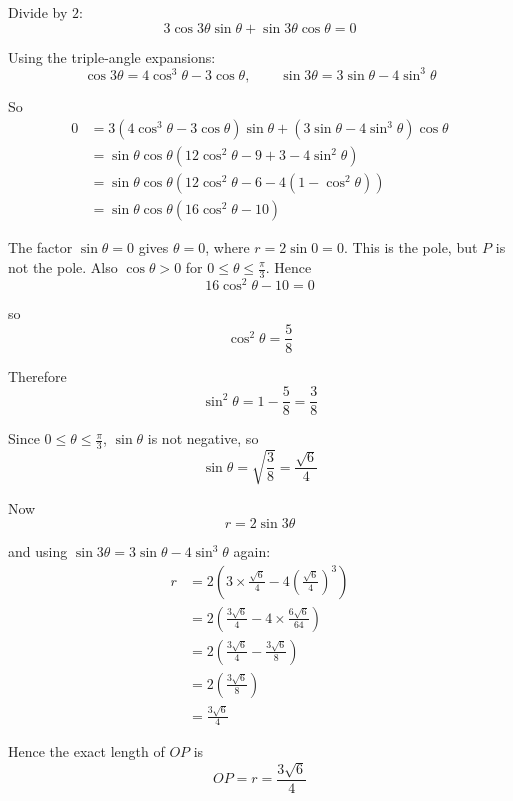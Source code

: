 \documentclass[leqno]{article}
\begin{document}
\begin{enumerate}[
  label=\textbf{\arabic*.},
  leftmargin=*,
  topsep=0pt,
  partopsep=0pt,
  parsep=0pt
]
\begin{djsSolution}
Divide by \(2\):
\[
3\cos 3\theta \sin\theta+\sin 3\theta \cos\theta=0
\]

Using the triple-angle expansions:
\[
\cos 3\theta=4\cos^3\theta-3\cos\theta,
\qquad
\sin 3\theta=3\sin\theta-4\sin^3\theta
\]

So
\begin{align*}
0
&=3(4\cos^3\theta-3\cos\theta)\sin\theta+(3\sin\theta-4\sin^3\theta)\cos\theta \\
&=\sin\theta\cos\theta\left(12\cos^2\theta-9+3-4\sin^2\theta\right) \\
&=\sin\theta\cos\theta\left(12\cos^2\theta-6-4(1-\cos^2\theta)\right) \\
&=\sin\theta\cos\theta\left(16\cos^2\theta-10\right)
\end{align*}

The factor \(\sin\theta=0\) gives \(\theta=0\), where \(r=2\sin 0=0\). This is the pole, but \(P\) is not the pole. Also \(\cos\theta>0\) for \(0\leq\theta\leq\frac{\pi}{3}\). Hence
\[
16\cos^2\theta-10=0
\]

so
\[
\cos^2\theta=\frac58
\]

Therefore
\[
\sin^2\theta=1-\frac58=\frac38
\]

Since \(0\leq\theta\leq\frac{\pi}{3}\), \(\sin\theta\) is not negative, so
\[
\sin\theta=\sqrt{\frac38}=\frac{\sqrt6}{4}
\]

Now
\[
r=2\sin 3\theta
\]

and using \(\sin 3\theta=3\sin\theta-4\sin^3\theta\) again:
\begin{align*}
r
&=2\left(3\times \frac{\sqrt6}{4}-4\left(\frac{\sqrt6}{4}\right)^3\right) \\
&=2\left(\frac{3\sqrt6}{4}-4\times \frac{6\sqrt6}{64}\right) \\
&=2\left(\frac{3\sqrt6}{4}-\frac{3\sqrt6}{8}\right) \\
&=2\left(\frac{3\sqrt6}{8}\right) \\
&=\frac{3\sqrt6}{4}
\end{align*}

Hence the exact length of \(OP\) is
\[
OP=r=\frac{3\sqrt6}{4}
\]
\end{djsSolution}


\newpage

\questionitem

\begin{figure}[H]
    \centering
{}
\end{figure}



\end{enumerate}
\end{document}
